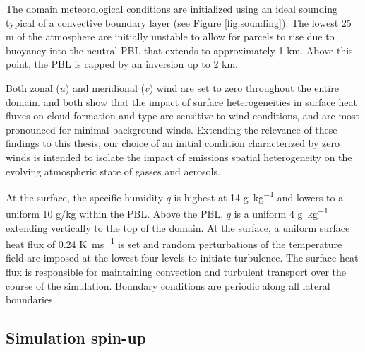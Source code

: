 The domain meteorological conditions are initialized using an ideal sounding typical of a convective boundary layer (see Figure \ref{fig:sounding}). The lowest 25 m of the atmosphere are initially unstable to allow for parcels to rise due to buoyancy into the neutral PBL that extends to approximately 1 km. Above this point, the PBL is capped by an inversion up to 2 km. 

Both zonal ($u$) and meridional ($v$) wind are set to zero throughout the entire domain. \cite{tian_how_2022} and \cite{fast_impact_2019} both show that the impact of surface heterogeneities in surface heat fluxes on cloud formation and type are sensitive to wind conditions, and are most pronounced for minimal background winds. Extending the relevance of these findings to this thesis, our choice of an initial condition characterized by zero winds is intended to isolate the impact of emissions spatial heterogeneity on the evolving atmospheric state of gasses and aerosols.

At the surface, the specific humidity $q$ is highest at 14 \si{g.kg^{-1}} and lowers to a uniform 10 g/kg within the PBL. Above the PBL, $q$ is a uniform 4 \si{g.kg^{-1}} extending vertically to the top of the domain. At the surface, a uniform surface heat flux of 0.24 \si{K.ms^{-1}} is set and random perturbations of the temperature field are imposed at the lowest four levels to initiate turbulence. The surface heat flux is responsible for maintaining convection and turbulent transport over the course of the simulation. Boundary conditions are periodic along all lateral boundaries.

\subsection{Simulation spin-up}

